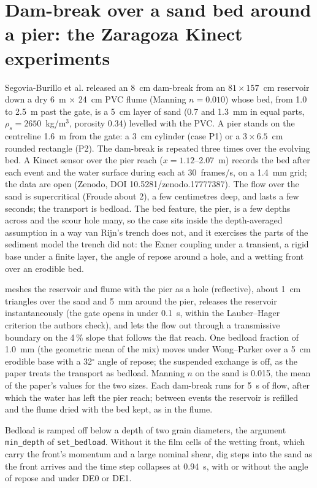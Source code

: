 
\section{Dam-break over a sand bed around a pier: the Zaragoza Kinect experiments}

Segovia-Burillo et al. \cite{SegoviaBurillo2026} released an 8~cm dam-break
from an $81 \times 157$~cm reservoir down a dry 6~m $\times$ 24~cm PVC flume
(Manning $n = 0.010$) whose bed, from 1.0 to 2.5~m past the gate, is a 5~cm
layer of sand (0.7 and 1.3~mm in equal parts, $\rho_s = 2650$~kg/m$^3$,
porosity 0.34) levelled with the PVC. A pier stands on the centreline 1.6~m
from the gate: a 3~cm cylinder (case P1) or a $3 \times 6.5$~cm rounded
rectangle (P2). The dam-break is repeated three times over the evolving
bed. A Kinect sensor over the pier reach ($x = 1.12$--2.07~m) records the
bed after each event and the water surface during each at 30~frames/s, on
a 1.4~mm grid; the data are open (Zenodo, DOI 10.5281/zenodo.17777387).
The flow over the sand is supercritical (Froude about 2), a few
centimetres deep, and lasts a few seconds; the transport is bedload. The
bed feature, the pier, is a few depths across and the scour hole many, so
the case sits inside the depth-averaged assumption in a way van Rijn's
trench does not, and it exercises the parts of the sediment model the
trench did not: the Exner coupling under a transient, a rigid base under a
finite layer, the angle of repose around a hole, and a wetting front over
an erodible bed.

\anuga{} meshes the reservoir and flume with the pier as a hole (reflective),
about 1~cm triangles over the sand and 5~mm around the pier, releases the
reservoir instantaneously (the gate opens in under 0.1~s, within the
Lauber--Hager criterion the authors check), and lets the flow out through
a transmissive boundary on the 4\,\% slope that follows the flat reach.
One bedload fraction of 1.0~mm (the geometric mean of the mix) moves under
Wong--Parker over a 5~cm erodible base with a 32$^\circ$ angle of repose;
the suspended exchange is off, as the paper treats the transport as
bedload. Manning $n$ on the sand is 0.015, the mean of the paper's values
for the two sizes. Each dam-break runs for 5~s of flow, after which the
water has left the pier reach; between events the reservoir is refilled and
the flume dried with the bed kept, as in the flume.

Bedload is ramped off below a depth of two grain diameters, the
argument \texttt{min\_depth} of \texttt{set\_bedload}. Without it the film cells of the
wetting front, which carry the front's momentum and a large nominal shear,
dig steps into the sand as the front arrives and the time step collapses at
0.94~s, with or without the angle of repose and under DE0 or DE1.

